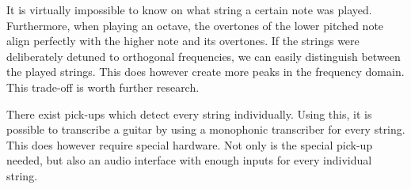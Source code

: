 \documentclass[10pt,twocolumn]{article}
\begin{document}
It is virtually impossible to know on what string a certain note was played. Furthermore, when playing an octave, the overtones of the lower pitched note align perfectly with the higher note and its overtones. If the strings were deliberately detuned to orthogonal frequencies, we can easily distinguish between the played strings. This does however create more peaks in the frequency domain. This trade-off is worth further research.

There exist pick-ups which detect every string individually. Using this, it is possible to transcribe a guitar by using a monophonic transcriber for every string. This does however require special hardware. Not only is the special pick-up needed, but also an audio interface with enough inputs for every individual string.





\end{document}
